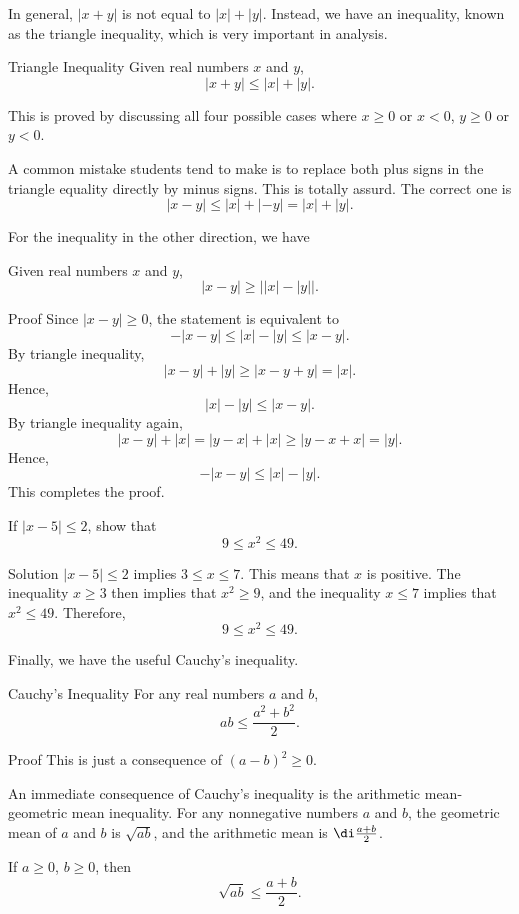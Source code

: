 In general, $|x+y|$ is not equal to $|x|+|y|$. Instead, we have an inequality, known as the triangle inequality, which is very important in analysis.



\begin{proposition}{Triangle Inequality}
Given real numbers $x$ and $y$, 
\[|x+y|\leq |x|+|y|.\]
\end{proposition}
This is proved by discussing all four  possible cases where $x\geq 0$ or $x<0$, $y\geq 0$ or $y<0$. 

A common mistake students tend to make is to replace both plus signs in the triangle equality directly by   minus signs. This is totally assurd. The correct one is
\[|x-y|\leq |x|+|-y|=|x|+|y|.\]

For the inequality in the other direction, we have
\begin{proposition}{}
Given real numbers $x$ and $y$, 
\[|x-y|\geq \left||x|-|y|\right|.\]
\end{proposition}
\begin{myproof}{Proof}
Since $|x-y|\geq 0$, the statement is equivalent to
\[-|x-y|\leq |x|-|y|\leq |x-y|.\]
By triangle inequality,
\[|x-y|+|y|\geq |x-y+y|=|x|.\]
Hence,
\[ |x|-|y|\leq |x-y|.\]
By triangle inequality again,
\[|x-y|+|x|=|y-x|+|x|\geq |y-x+x|=|y|.\]
Hence,
\[-|x-y|\leq |x|-|y|.\]
This completes the proof.

\end{myproof}

\begin{example}{}
If $|x-5|\leq 2$, show that 
\[9\leq x^2\leq 49.\]

\end{example}
\begin{solution}
{Solution}
$|x-5|\leq 2$ implies $3\leq x\leq 7$.
This means that $x$ is positive. The inequality $x\geq 3$ then  implies that $x^2\geq 9$, and the inequality $x\leq 7$ implies that $x^2\leq 49$. Therefore,
\[9\leq x^2\leq 49.\]
\end{solution}

Finally, we have the useful Cauchy's inequality.
\begin{proposition}{Cauchy's Inequality}
For any real numbers $a$ and $b$,
\[ab\leq \frac{a^2+b^2}{2}.\]
\end{proposition}
\begin{myproof}{Proof}
This is just a consequence of $(a-b)^2\geq 0$.
\end{myproof}

An immediate consequence of Cauchy's inequality is the arithmetic mean-geometric mean inequality. For any nonnegative numbers $a$ and $b$, the geometric mean of $a$ and $b$ is 
$\sqrt{ab}$, and the arithmetic mean is $\di \frac{a+b}{2}$. 
\begin{proposition}{}
 If $a\geq 0$, $b\geq 0$, then
\[\sqrt{ab}\leq \frac{a+b}{2}.
\]
\end{proposition}

